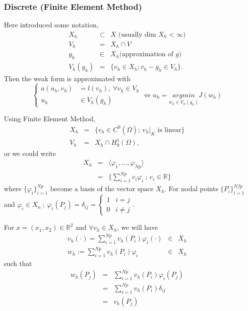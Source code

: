 \documentclass[a4paper,10pt]{article}
\begin{document}
\subsubsection{Discrete (Finite Element Method)}
Here introduced some notation,
\begin{eqnarray}\nonumber
X_{h} &\subset & X \text{ (usually dim } X_{h} < \infty \text{)} \\ \nonumber
V_{h} & = & X_{h} \cap V\\ \nonumber
g_{h} & \in & X_{h} \text{(approximation of } g \text{)} \\ \nonumber
V_{h}(g_{h}) & = & \{ v_{h} \in X_{h} ; v_{h}-g_{h} \in V_{h} \}.
\end{eqnarray}
Then the weak form is approximated with
\begin{equation} \nonumber
\begin{cases}
a(u_{h}, v_{h}) &= l(v_{h}), \ \forall v_{h} \in V_{h} \\
u_{h} &\in V_{h}(g_{h})
\end{cases}
\iff u_{h} = \underset{w_{h} \in V_{h}(g_{h})}{argmin}J(w_{h})
\end{equation}

Using Finite Element Method,
\begin{eqnarray}\nonumber
X_{h} &=& \{ v_{h} \in C^{0}(\overline{\Omega}) ; \ {v_{h}|}_{K} \text{ is linear} \} \\ \nonumber
V_{h} &=& X_{h} \cap H_{0}^{1}(\Omega),
\end{eqnarray}
or we could write
\begin{eqnarray} \nonumber
X_h &=& \langle \varphi_1, \dots  , \varphi_{Np} \rangle\\ \nonumber
&=& \{\sum_{i=1}^{Np} c_i\varphi_i \ ; \ c_i \in \mathbb{R} \}
\end{eqnarray}
where $ \{\varphi_i\}^{Np}_{i=1} \text{ become a basis of the vector space } X_h $. For nodal points $ \{P_{i}\}_{i=1}^{Nf{p}} $ and $ \varphi_{i} \in X_{n} \ ; \ \varphi_{i} (P_{j}) = \delta_{ij} = \begin{cases}
1 & i=j \\ 0 & i \neq j
\end{cases} $.

For $ x = (x_1,x_2) \in \mathbb{R}^2 \text{ and } \forall v_h \in X_h $, we will have
\begin{eqnarray} \nonumber
v_h (\cdot) = \sum_{i=1}^{Np} v_h(P_i) \varphi_i(\cdot) &\in& X_h\\ \nonumber
w_h := \sum_{i=1}^{Np} v_h(P_i) \varphi_i &\in& X_h
\end{eqnarray}
such that
\begin{eqnarray}
 \nonumber
w_h(P_j) &=& \sum_{i=1}^{Np} v_h (P_i) \varphi_i (P_j)\\ \nonumber
&=& \sum_{i=1}^{Np} v_h (P_i) \delta_{ij}\\ \nonumber
&=& v_h (P_j)
\end{eqnarray}
\end{document}
